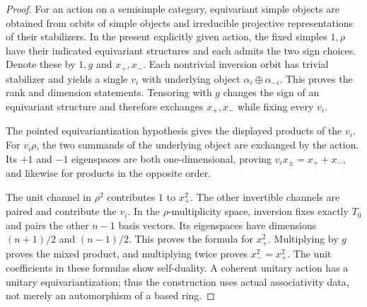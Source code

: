 \begin{proof}
For an action on a semisimple category, equivariant simple objects are
obtained from orbits of simple objects and irreducible projective
representations of their stabilizers. In the present explicitly given
action, the fixed simples $1,\rho$ have their indicated equivariant
structures and each admits the two sign choices. Denote these by $1,g$
and $x_+,x_-$. Each nontrivial inversion orbit has trivial stabilizer
and yields a single $v_i$ with underlying object
$\alpha_i\oplus\alpha_{-i}$. This proves the rank and dimension statements.
Tensoring with $g$ changes the sign of an equivariant structure and
therefore exchanges $x_+,x_-$ while fixing every $v_i$.

The pointed equivariantization hypothesis gives the displayed products
of the $v_i$. For $v_i\rho$, the two summands of the underlying object
are exchanged by the action. Its $+1$ and $-1$ eigenspaces are both
one-dimensional, proving $v_i x_\pm=x_++x_-$, and likewise for products
in the opposite order.

The unit channel in $\rho^2$ contributes $1$ to $x_+^2$. The other
invertible channels are paired and contribute the $v_i$. In the
$\rho$-multiplicity space, inversion fixes exactly $T_0$ and pairs the
other $n-1$ basis vectors. Its eigenspaces have dimensions $(n+1)/2$
and $(n-1)/2$. This proves the formula for $x_+^2$. Multiplying by $g$
proves the mixed product, and multiplying twice proves $x_-^2=x_+^2$.
The unit coefficients in these formulas show self-duality. A coherent
unitary action has a unitary equivariantization; thus the construction
uses actual associativity data, not merely an automorphism of a based
ring.
\end{proof}

